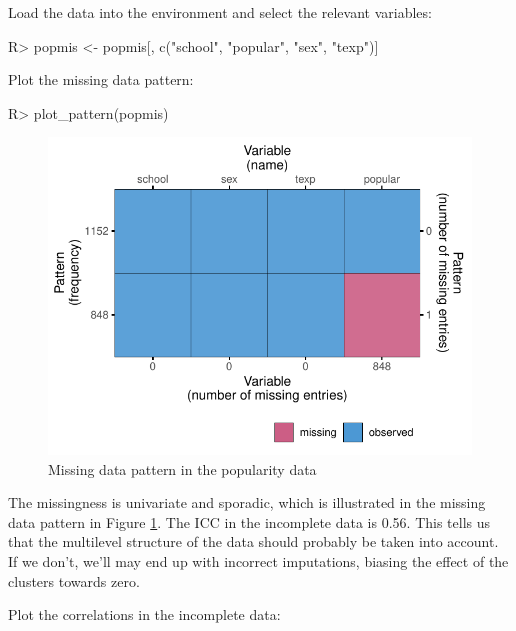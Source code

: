 \documentclass[
]{jss}
\begin{document}
Load the data into the environment and select the relevant variables:

\begin{CodeChunk}
\begin{CodeInput}
R> popmis <- popmis[, c("school", "popular", "sex", "texp")] 
\end{CodeInput}
\end{CodeChunk}

Plot the missing data pattern:

\begin{CodeChunk}
\begin{CodeInput}
R> plot_pattern(popmis)
\end{CodeInput}
\begin{figure}

{\centering \includegraphics{Imputation_of_Incomplete_Multilevel_Data_files/figure-latex/pop_pat-1} 

}

\caption[Missing data pattern in the popularity data]{Missing data pattern in the popularity data}\label{fig:pop_pat}
\end{figure}
\end{CodeChunk}

The missingness is univariate and sporadic, which is illustrated in the
missing data pattern in Figure \ref{fig:pop_pat}. The ICC in the
incomplete data is 0.56. This tells us that the multilevel structure of
the data should probably be taken into account. If we don't, we'll may
end up with incorrect imputations, biasing the effect of the clusters
towards zero.

Plot the correlations in the incomplete data:
\end{document}
